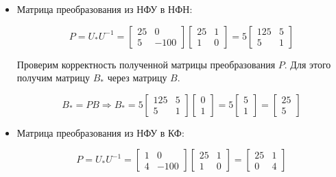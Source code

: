 \documentclass[14pt,a4paper,report]{report}
\begin{document}
\begin{itemize}
	\item Матрица преобразования из НФУ в НФН:
	
	\begin{equation*}
	\text{$P=U_{*}U^{-1}=\begin{bmatrix} 25 & 0 \\ 5 & -100 \end{bmatrix}\begin{bmatrix} 25 & 1 \\ 1 & 0 \end{bmatrix}=5\begin{bmatrix} 125 & 5 \\ 5 & 1 \end{bmatrix}$}
	\end{equation*}
	
	Проверим корректность полученной матрицы преобразования $P$. Для этого получим матрицу $B_{*}$ через матрицу $B$. 
	
	\begin{equation*}
	\text{$B_{*}=PB$}
	\Longrightarrow
	\text{$B_{*}=5\begin{bmatrix} 125 & 5 \\ 5 & 1 \end{bmatrix}\begin{bmatrix} 0 \\ 1 \end{bmatrix}=5\begin{bmatrix} 5 \\ 1 \end{bmatrix}=\begin{bmatrix} 25 \\ 5 \end{bmatrix}$}
	\end{equation*}
	
	\item Матрица преобразования из НФУ в КФ:
	
	\begin{equation*}
	\text{$P=U_{*}U^{-1}=\begin{bmatrix} 1 & 0 \\ 4 & -100 \end{bmatrix}\begin{bmatrix} 25 & 1 \\ 1 & 0 \end{bmatrix}=\begin{bmatrix} 25 & 1 \\ 0 & 4 \end{bmatrix}$}
	\end{equation*}
	

\end{itemize}
\end{document}
